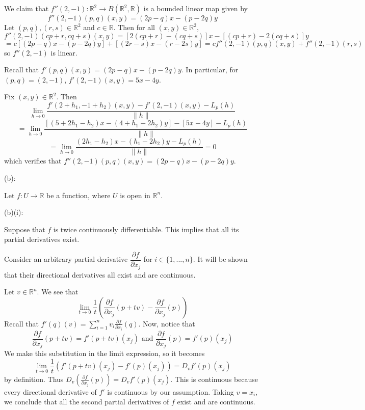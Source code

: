 \documentclass{article}
\theoremstyle{plain} %
\numberwithin{thm}{section} %
\theoremstyle{definition}
\begin{document}
\begin{question}{28}
        We claim that \(f''(2,-1) : \mathbb{R}^2 \to B(\mathbb{R}^2,\mathbb{R})\) is a bounded linear map given by
        \[
            f''(2,-1)(p,q)(x,y) = (2p - q)x - (p - 2q)y
        \]
        Let \((p,q), (r,s) \in \mathbb{R}^2\) and \(c \in \mathbb{R}\). Then for all \((x,y) \in \mathbb{R}^2\),
        \[
            f''(2,-1)(cp + r, cq + s)(x,y) = [2(cp + r) - (cq + s)]x - [(cp + r) - 2(cq + s)]y
        \]
        \[
            = c[(2p - q)x - (p - 2q)y] + [(2r - s)x - (r - 2s)y] = cf''(2,-1)(p,q)(x,y) + f''(2,-1)(r,s)
        \]
        so \(f''(2,-1)\) is linear.

        Recall that \(f'(p,q)(x,y) = (2p - q)x - (p - 2q)y\). In particular, for \((p,q) = (2,-1)\), \(f'(2,-1)(x,y) = 5x - 4y\).
        
        Fix \((x,y) \in \mathbb{R}^2\). Then
        \[
            \lim_{h \to 0} \frac{f'(2 + h_1, -1 + h_2)(x,y) - f'(2,-1)(x,y) - L_p(h)}{\|h\|}
        \]
        \[
            = \lim_{h \to 0} \frac{[(5 + 2h_1 - h_2)x - (4 + h_1 - 2h_2)y] - [5x - 4y] - L_p(h)}{\|h\|}
        \]
        \[
            = \lim_{h \to 0} \frac{(2h_1 - h_2)x - (h_1 - 2h_2)y - L_p(h)}{\|h\|} = 0
        \]
        which verifies that \(f''(2,-1)(p,q)(x,y) = (2p - q)x - (p - 2q)y\).

        (b):

        Let \(f : U \to \mathbb{R}\) be a function, where \(U\) is open in \(\mathbb{R}^n\).

        (b)(i):

        Suppose that \(f\) is twice continuously differentiable. This implies that all its partial derivatives exist.

        Consider an arbitrary partial derivative \(\dfrac{\partial f}{\partial x_j}\) for \(i \in \{1, ..., n\}\). It will be shown that their directional derivatives all exist and are continuous.

        Let \(v \in \mathbb{R}^n\). We see that
        \[
            \lim_{t \to 0} \frac{1}{t}\left( \frac{\partial f}{\partial x_j} (p+tv) - \frac{\partial f}{\partial x_j} (p) \right) 
        \]
        Recall that \(f'(q)(v) = \sum_{i=1} ^n v_i \frac{\partial f}{\partial x_i} (q)\). Now, notice that
        \[
            \frac{\partial f}{\partial x_j} (p+tv) = f'(p+tv)(x_j) \text{ and } \frac{\partial f}{\partial x_j} (p) = f'(p)(x_j)
        \]
        We make this substitution in the limit expression, so it becomes
        \[
            \lim_{t \to 0} \frac{1}{t}(f'(p+tv)(x_j) - f'(p)(x_j)) = D_v f'(p)(x_j)
        \]
        by definition. Thus \(D_v \left( \frac{\partial f}{\partial x_j} (p)\right) = D_v f'(p)(x_j)\). This is continuous because every directional derivative of \(f'\) is continuous by our assumption. Taking \(v = x_i\), we conclude that all the second partial derivatives of \(f\) exist and are continuous.
        

\end{question}
\end{document}
